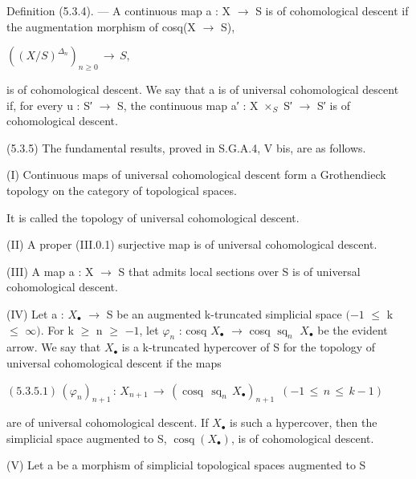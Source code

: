 \documentclass[11pt,twoside]{article}
\newcommand{\DFormula}[1]{%
  \par\smallskip\noindent\hspace*{0pt}\(\displaystyle #1\)\par\smallskip
}
\begin{document}
Definition (5.3.4). — A continuous map a : X \(\to \) S is of cohomological descent if the augmentation morphism of cosq(X \(\to \) S),\par
\par\medskip
\DFormula{((X/S)^{\Delta _{n}})_{n\geq 0}\,\to \,S,}
\par\medskip
is of cohomological descent. We say that a is of universal cohomological descent if, for every u : S′ \(\to \) S, the continuous map a′ : X \(\times _{S}\) S′ \(\to \) S′ is of cohomological descent.\par
\par\medskip
(5.3.5) The fundamental results, proved in S.G.A.4, V bis, are as follows.\par
\par\medskip
(I) Continuous maps of universal cohomological descent form a Grothendieck topology on the category of topological spaces.\par
\par\medskip
It is called the topology of universal cohomological descent.\par
\par\medskip
(II) A proper (III.0.1) surjective map is of universal cohomological descent.\par
\par\medskip
(III) A map a : X \(\to \) S that admits local sections over S is of universal cohomological descent.\par
\par\medskip
(IV) Let a : \(X_{\bullet }\) \(\to \) S be an augmented k-truncated simplicial space \((−1\) \(\leq \) k \(\leq \) \(\infty )\). For k \(\geq \) n \(\geq \) \(−1\), let \(\varphi _{n}\) : cosq \(X_{\bullet }\) \(\to \) cosq \(\operatorname{sq}_{n}\) \(X_{\bullet }\) be the evident arrow. We say that \(X_{\bullet }\) is a k-truncated hypercover of S for the topology of universal cohomological descent if the maps\par
\par\medskip
\DFormula{(5.3.5.1)\,(\varphi _{n})_{n+1}\,:\,X_{n+1}\,\to \,(\operatorname{cosq}\,\operatorname{sq}_{n}\,X_{\bullet })_{n+1}\,\,\,(−1\,\leq \,n\,\leq \,k−1)}
\par\medskip
are of universal cohomological descent. If \(X_{\bullet }\) is such a hypercover, then the simplicial space augmented to S, \(\operatorname{cosq}(X_{\bullet })\), is of cohomological descent.\par
\par\medskip
(V) Let a be a morphism of simplicial topological spaces augmented to S\par
\end{document}
